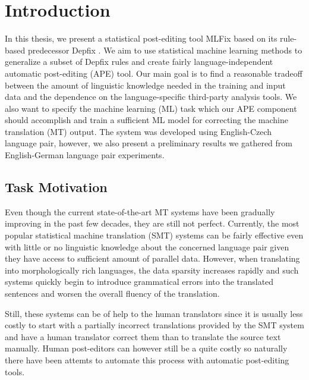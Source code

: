 \chapter{Introduction}

In this thesis, we present a statistical post-editing tool MLFix
based on its rule-based predecessor Depfix \citep{depfix:2014}.
We aim to use statistical machine learning methods to generalize a subset of Depfix rules
and create fairly language-independent automatic post-editing (APE) tool.
Our main goal is to find a reasonable tradeoff between the amount
of linguistic knowledge needed in the training and input data
and the dependence
on the language-specific third-party analysis tools.
We also want to specify the
machine learning (ML) task which our APE component should accomplish and train
a sufficient ML model for correcting the machine translation (MT) output.
The system was developed using English-Czech language pair, however, we also present
a preliminary results we gathered from English-German language pair experiments.

\section{Task Motivation}

Even though the current state-of-the-art MT systems have been gradually improving in the
past few decades, they are still not perfect. Currently, the most popular statistical machine
translation (SMT) systems can be fairly effective even 
with little or no
linguistic knowledge about the concerned language pair given they have access to sufficient
amount of parallel data. However, when translating into morphologically rich languages,
the data sparsity increases rapidly and such systems quickly begin to introduce grammatical
errors into the translated sentences and worsen the overall fluency of the translation.

Still, these systems can be of help to the human translators since it is usually less costly
to start with a partially incorrect translations provided by the SMT system and have
a human translator correct them than to translate the source text manually.
Human post-editors can however still be a quite costly so naturally there have been
attemts to automate this process with automatic post-editing tools.

